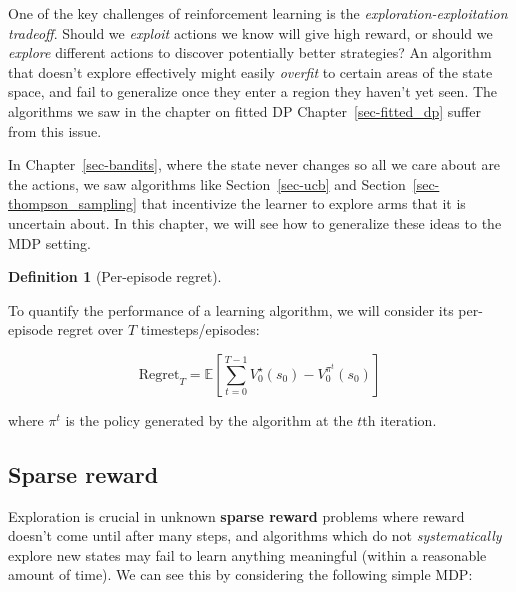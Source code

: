 \documentclass[
  letterpaper,
  DIV=11,
  numbers=noendperiod]{scrreprt}
\theoremstyle{plain}
\theoremstyle{plain}
\theoremstyle{definition}
\theoremstyle{definition}
\newtheorem{definition}{Definition}[chapter]
\theoremstyle{remark}
\begin{document}
One of the key challenges of reinforcement learning is the
\emph{exploration-exploitation tradeoff}. Should we \emph{exploit}
actions we know will give high reward, or should we \emph{explore}
different actions to discover potentially better strategies? An
algorithm that doesn't explore effectively might easily \emph{overfit}
to certain areas of the state space, and fail to generalize once they
enter a region they haven't yet seen. The algorithms we saw in the
chapter on fitted DP Chapter~\ref{sec-fitted_dp} suffer from this issue.

In Chapter~\ref{sec-bandits}, where the state never changes so all we
care about are the actions, we saw algorithms like Section~\ref{sec-ucb}
and Section~\ref{sec-thompson_sampling} that incentivize the learner to
explore arms that it is uncertain about. In this chapter, we will see
how to generalize these ideas to the MDP setting.

\begin{definition}[Per-episode
regret]\protect\hypertarget{def-per_episode_regret}{}\label{def-per_episode_regret}

To quantify the performance of a learning algorithm, we will consider
its per-episode regret over \(T\) timesteps/episodes:

\[\text{Regret}_T = \mathbb{E}\left[ \sum_{t=0}^{T-1} V^\star_0(s_0) - V^{\pi^t}_0(s_0) \right]\]

where \(\pi^t\) is the policy generated by the algorithm at the \(t\)th
iteration.

\end{definition}

\subsection{Sparse reward}\label{sparse-reward}

Exploration is crucial in unknown \textbf{sparse reward} problems where
reward doesn't come until after many steps, and algorithms which do not
\emph{systematically} explore new states may fail to learn anything
meaningful (within a reasonable amount of time). We can see this by
considering the following simple MDP:
\end{document}
